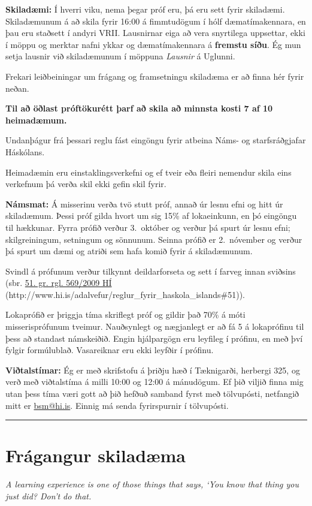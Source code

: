 \documentclass[b5paper,11pt,icelandic]{sphinxmanual}
\begin{document}
\textbf{Skiladæmi:} Í hverri viku, nema þegar próf eru, þá eru sett fyrir
skiladæmi. Skiladæmunum á að skila fyrir 16:00 á fimmtudögum í hólf
dæmatímakennara, en þau eru staðsett í andyri VRII. Lausnirnar eiga að
vera snyrtilega uppsettar, ekki í möppu og merktar nafni ykkar og
dæmatímakennara á \textbf{fremstu síðu}. Ég mun setja lausnir við
skiladæmunum í möppuna \emph{Lausnir} á Uglunni.

Frekari leiðbeiningar um frágang og framsetningu skiladæma er að finna
hér fyrir neðan.

\begin{center}\textbf{Til að öðlast próftökurétt þarf að skila
að minnsta kosti 7 af 10 heimadæmum.}
\end{center}
Undanþágur frá þessari reglu fást eingöngu fyrir atbeina Náms- og starfsráðgjafar Háskólans.

Heimadæmin eru einstaklingsverkefni og ef tveir eða fleiri nemendur skila
eins verkefnum þá verða skil ekki gefin skil fyrir.

\textbf{Námsmat:} Á misserinu verða tvö stutt próf, annað úr lesnu efni og
hitt úr skiladæmum. Þessi próf gilda hvort um sig 15\% af lokaeinkunn, en
þó eingöngu til hækkunar. Fyrra prófið verður 3. október og verður þá
spurt úr lesnu efni; skilgreiningum, setningum og sönnunum. Seinna
prófið er 2. nóvember og verður þá spurt um dæmi og atriði sem hafa
komið fyrir á skiladæmunum.

Svindl á prófunum verður
tilkynnt deildarforseta og sett í
farveg innan sviðsins (sbr.
\href{http://www.hi.is/adalvefur/reglur\_fyrir\_haskola\_islands\#51}{51. gr. rgl. 569/2009 HÍ} (http://www.hi.is/adalvefur/reglur\_fyrir\_haskola\_islands\#51)).

Lokaprófið er þriggja tíma skriflegt próf og gildir það 70\% á móti
misserisprófunum tveimur. Nauðsynlegt og nægjanlegt er að fá 5 á
lokaprófinu til þess að standast námskeiðið. Engin hjálpargögn eru
leyfileg í prófinu, en með því fylgir formúlublað.
Vasareiknar eru ekki leyfðir í prófinu.

\textbf{Viðtalstímar:} Ég er með skrifstofu á þriðju hæð í Tæknigarði,
herbergi 325, og verð með viðtalstíma á milli 10:00 og 12:00 á
mánudögum. Ef þið viljið finna mig utan þess tíma væri gott að þið
hefðuð samband fyrst með tölvupósti, netfangið mitt er \href{mailto:bsm@hi.is}{bsm@hi.is}. Einnig
má senda fyrirspurnir í tölvupósti.


\bigskip\hrule{}\bigskip

\newpage

\section{Frágangur skiladæma}
\label{vidauki:fragangur-skiladaema}
\emph{A learning experience is one of those things that says,
`You know that thing you just did? Don't do that.}
\end{document}
